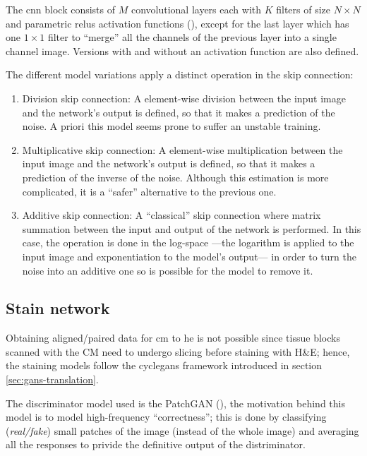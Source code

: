 \documentclass[../main.tex]{subfiles}
\begin{document}
The \gls{cnn} block consists of $M$ convolutional layers each with $K$ filters
of size $N \times N$ and parametric \glspl{relu} activation functions
(\cite{he2015delving}),
except for the last layer which has one $1 \times 1$ filter to ``merge'' all
the channels of the previous layer into a single channel image.
Versions with and without an activation function are also defined.

The different model variations apply a distinct operation in the skip connection:
\begin{enumerate}
  \item Division skip connection: A element-wise division between
  the input image and the network's output is defined,
  so that it makes a prediction of the noise. A priori this model seems prone
  to suffer an unstable training.
  \item Multiplicative skip connection: A element-wise multiplication between
  the input image and the network's output is defined,
  so that it makes a prediction of the inverse of the noise.
  Although this estimation is more complicated, it is a ``safer'' alternative
  to the previous one.
  \item Additive skip connection: A ``classical'' skip connection where matrix
  summation between the input and output of the network is performed.
  In this case, the operation is done in the log-space ---the logarithm
  is applied to the input image and exponentiation to the model's output---
  in order to turn the noise into an additive one so is possible for the
  model to remove it.
\end{enumerate}

\subsection{Stain network}\label{sec:stain-network}

Obtaining aligned/paired data for \gls{cm} to \gls{he} is not possible since
tissue blocks scanned with the CM need to undergo slicing
before staining with H\&E; hence,
the staining models follow the \gls{cyclegans} framework introduced in section
\ref{sec:gans-translation}.

The discriminator model used is the PatchGAN (\cite{Zhu2017a}), the motivation
behind this model is to model high-frequency ``correctness''; this is done
by classifying (\emph{real/fake}) small patches of the image
(instead of the whole image) and averaging
all the responses to privide the definitive output of the distriminator.
\end{document}
